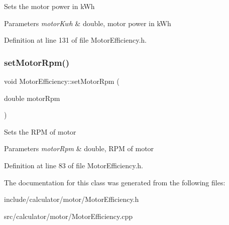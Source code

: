 Sets the motor power in k\+Wh 
\begin{DoxyParams}{Parameters}
{\em motor\+Kwh} & double, motor power in k\+Wh \\
\hline
\end{DoxyParams}


Definition at line 131 of file Motor\+Efficiency.\+h.

\mbox{\label{class_motor_efficiency_a2c4ddf9f2f3e44c098dad91a0ddbaf21}} 
\subsubsection{\texorpdfstring{set\+Motor\+Rpm()}{setMotorRpm()}}
{\footnotesize\ttfamily void Motor\+Efficiency\+::set\+Motor\+Rpm (\begin{DoxyParamCaption}\item[{double}]{motor\+Rpm }\end{DoxyParamCaption})\hspace{0.3cm}{\ttfamily [inline]}}

Sets the R\+PM of motor 
\begin{DoxyParams}{Parameters}
{\em motor\+Rpm} & double, R\+PM of motor \\
\hline
\end{DoxyParams}


Definition at line 83 of file Motor\+Efficiency.\+h.



The documentation for this class was generated from the following files\+:\begin{DoxyCompactItemize}
\item 
include/calculator/motor/Motor\+Efficiency.\+h\item 
src/calculator/motor/Motor\+Efficiency.\+cpp\end{DoxyCompactItemize}

